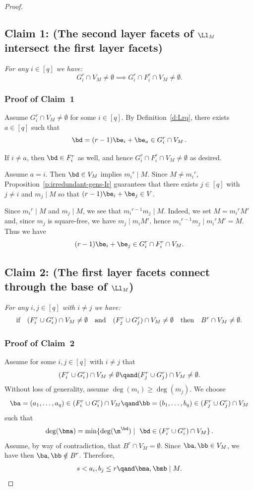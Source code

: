 \begin{proof}
\subsection*{\texorpdfstring{ \bf Claim 1: \textup{(}The second layer facets of ${\Ll}_M$
  intersect the first layer facets\textup{)}}{}} {\it For any $i\in [q]$ we have:}
$$G^r_{i}\cap V_M\ne \emptyset\implies G^r_{i}\cap F^r_{i}\cap
  V_{M}\ne \emptyset .$$


\subsubsection*{Proof of Claim~1} 
Assume $G^r_{i}\cap V_M\ne \emptyset$ for some $i\in [q]$.
By Definition~\ref{d:Lrq}, there exists $a\in [q]$ such that $$\bd = (r-1)\be_i +
\be_a \in G^r_{i}\cap V_M\,.$$

If $i\ne a$, then $\bd\in F^r_i$ as well, and hence
$G^r_{i}\cap F^r_{i}\cap V_M \ne \emptyset$ as desired.

Assume $a=i$. Then $\bd\in V_M$ implies ${m_i}^r\mid M$. Since $M\neq
{m_i}^r$, Proposition~\ref{p:irredundant-gens-Ir} guarantees that there exists
$j\in [q]$ with $j \neq i$ and $m_j \mid M$ so that $(r-1)\be_i+\be_j
\in V$.

 Since ${m_i}^r\mid M$ and $m_j\mid M$, we see that ${m_i}^{r-1}m_j\mid
 M$.  Indeed, we set $M={m_i}^rM'$ and, since $m_j$ is square-free, we
 have $m_j\mid m_iM'$, hence ${m_i}^{r-1}m_j\mid {m_i}^rM'=M$.
Thus we have
$$(r-1)\be_i+\be_j \in G^r_{i}\cap F^r_{i}\cap V_M.$$

 
\subsection*{\texorpdfstring{\bf Claim 2: \textup{(}The first layer facets connect through the
  base of ${\Ll}_M$\textup{)}} {} } {\it For any $i,j\in [q]$ with $i\ne j$ we
  have:}
$$ \mbox{\rm{if}} \quad (F^r_i\cup G^r_{i})\cap V_M\ne \emptyset\quad\text{and}\quad
 (F^r_j\cup G^r_{j})\cap V_M\ne \emptyset \quad \mbox{\rm{then}} \quad B^r \cap V_M\ne
 \emptyset .$$


 \subsubsection*{Proof of Claim~2}
 Assume for some $i,j\in [q]$ with $i\ne j$ that 
$$ (F^r_i\cup G^r_{i})\cap V_M\ne \emptyset \qand
 (F^r_j\cup G^r_{j})\cap V_M\ne \emptyset.$$
Without loss of generality, assume $\deg(m_i)\ge \deg(m_j)$. We choose 
 $$\ba = (a_1, \ldots, a_q) \in (F^r_i\cup G^r_{i})\cap V_M\qand
 \bb = (b_1, \ldots, b_q) \in (F^r_j\cup G^r_{j})\cap V_M$$
 such that 
 \begin{equation}
 \label{e:choose-a}
 \deg(\bma)=\min\{\deg(\m^\bd)\mid \ \bd\in (F^r_i\cup G^r_{i})\cap V_M\}\,.
 \end{equation}
 Assume, by way of contradiction, that $B^r\cap V_M=\emptyset$.  
   Since $\ba, \bb \in V_M$, we have then $\ba, \bb \notin B^r$.
   Therefore, $$s <a_i,b_j \le r \qand \bma, \bmb \mid M.$$


\end{proof}
